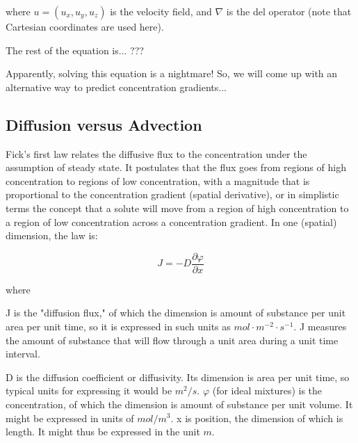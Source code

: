 \documentclass{tufte-handout}
\begin{document}
where $u = (u_x, u_y, u_z)$ is the velocity field, and $\nabla$ is the del operator (note that Cartesian coordinates are used here).

The rest of the equation is... ???

Apparently, solving this equation is a nightmare!  So, we will come up with an alternative way to predict concentration gradients...

\subsection{Diffusion versus Advection}

Fick's first law relates the diffusive flux to the concentration under the assumption of steady state. It postulates that the flux goes from regions of high concentration to regions of low concentration, with a magnitude that is proportional to the concentration gradient (spatial derivative), or in simplistic terms the concept that a solute will move from a region of high concentration to a region of low concentration across a concentration gradient. In one (spatial) dimension, the law is:

\begin{equation}
J=-D{\frac {\partial \varphi }{\partial x}}
\end{equation}

where

J is the "diffusion flux," of which the dimension is amount of substance per unit area per unit time, so it is expressed in such units as $mol\cdot m^{−2}\cdot s^{−1}$. J measures the amount of substance that will flow through a unit area during a unit time interval.

D is the diffusion coefficient or diffusivity. Its dimension is area per unit time, so typical units for expressing it would be $m^2/s$. $\varphi$ (for ideal mixtures) is the concentration, of which the dimension is amount of substance per unit volume. It might be expressed in units of $mol/m^3$.
x is position, the dimension of which is length. It might thus be expressed in the unit $m$.
\end{document}
